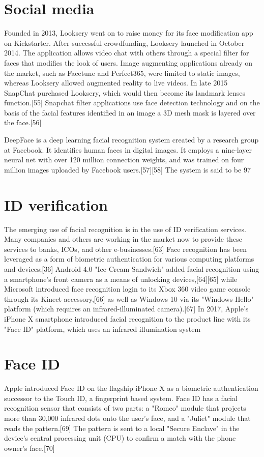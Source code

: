 \section{Social media}
Founded in 2013, Looksery went on to raise money for its face modification app on Kickstarter. After successful crowdfunding, Looksery launched in October 2014. The application allows video chat with others through a special filter for faces that modifies the look of users. Image augmenting applications already on the market, such as Facetune and Perfect365, were limited to static images, whereas Looksery allowed augmented reality to live videos. In late 2015 SnapChat purchased Looksery, which would then become its landmark lenses function.[55] Snapchat filter applications use face detection technology and on the basis of the facial features identified in an image a 3D mesh mask is layered over the face.[56]

DeepFace is a deep learning facial recognition system created by a research group at Facebook. It identifies human faces in digital images. It employs a nine-layer neural net with over 120 million connection weights, and was trained on four million images uploaded by Facebook users.[57][58] The system is said to be 97%
\newpage
\section{ID verification}
The emerging use of facial recognition is in the use of ID verification services. Many companies and others are working in the market now to provide these services to banks, ICOs, and other e-businesses.[63] Face recognition has been leveraged as a form of biometric authentication for various computing platforms and devices;[36] Android 4.0 "Ice Cream Sandwich" added facial recognition using a smartphone's front camera as a means of unlocking devices,[64][65] while Microsoft introduced face recognition login to its Xbox 360 video game console through its Kinect accessory,[66] as well as Windows 10 via its "Windows Hello" platform (which requires an infrared-illuminated camera).[67] In 2017, Apple's iPhone X smartphone introduced facial recognition to the product line with its "Face ID" platform, which uses an infrared illumination system
\newpage
\section{Face ID}
Apple introduced Face ID on the flagship iPhone X as a biometric authentication successor to the Touch ID, a fingerprint based system. Face ID has a facial recognition sensor that consists of two parts: a "Romeo" module that projects more than 30,000 infrared dots onto the user's face, and a "Juliet" module that reads the pattern.[69] The pattern is sent to a local "Secure Enclave" in the device's central processing unit (CPU) to confirm a match with the phone owner's face.[70]

